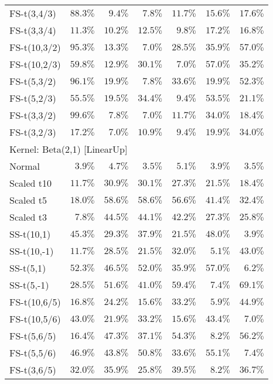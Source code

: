 \begin{longtable}{lrrrrrr}
FS-t(3,4/3) & $88.3\%$ & $9.4\%$ & $7.8\%$ & $11.7\%$ & $15.6\%$ & $17.6\%$ \\ 
FS-t(3,3/4) & $11.3\%$ & $10.2\%$ & $12.5\%$ & $9.8\%$ & $17.2\%$ & $16.8\%$ \\ 
FS-t(10,3/2) & $95.3\%$ & $13.3\%$ & $7.0\%$ & $28.5\%$ & $35.9\%$ & $57.0\%$ \\ 
FS-t(10,2/3) & $59.8\%$ & $12.9\%$ & $30.1\%$ & $7.0\%$ & $57.0\%$ & $35.2\%$ \\ 
FS-t(5,3/2) & $96.1\%$ & $19.9\%$ & $7.8\%$ & $33.6\%$ & $19.9\%$ & $52.3\%$ \\ 
FS-t(5,2/3) & $55.5\%$ & $19.5\%$ & $34.4\%$ & $9.4\%$ & $53.5\%$ & $21.1\%$ \\ 
FS-t(3,3/2) & $99.6\%$ & $7.8\%$ & $7.0\%$ & $11.7\%$ & $34.0\%$ & $18.4\%$ \\ 
FS-t(3,2/3) & $17.2\%$ & $7.0\%$ & $10.9\%$ & $9.4\%$ & $19.9\%$ & $34.0\%$ \\ 
\midrule
\multicolumn{7}{l}{Kernel: Beta(2,1) [LinearUp]} \\ 
\midrule
Normal & $3.9\%$ & $4.7\%$ & $3.5\%$ & $5.1\%$ & $3.9\%$ & $3.5\%$ \\ 
Scaled t10 & $11.7\%$ & $30.9\%$ & $30.1\%$ & $27.3\%$ & $21.5\%$ & $18.4\%$ \\ 
Scaled t5 & $18.0\%$ & $58.6\%$ & $58.6\%$ & $56.6\%$ & $41.4\%$ & $32.4\%$ \\ 
Scaled t3 & $7.8\%$ & $44.5\%$ & $44.1\%$ & $42.2\%$ & $27.3\%$ & $25.8\%$ \\ 
SS-t(10,1) & $45.3\%$ & $29.3\%$ & $37.9\%$ & $21.5\%$ & $48.0\%$ & $3.9\%$ \\ 
SS-t(10,-1) & $11.7\%$ & $28.5\%$ & $21.5\%$ & $32.0\%$ & $5.1\%$ & $43.0\%$ \\ 
SS-t(5,1) & $52.3\%$ & $46.5\%$ & $52.0\%$ & $35.9\%$ & $57.0\%$ & $6.2\%$ \\ 
SS-t(5,-1) & $28.5\%$ & $51.6\%$ & $41.0\%$ & $59.4\%$ & $7.4\%$ & $69.1\%$ \\ 
FS-t(10,6/5) & $16.8\%$ & $24.2\%$ & $15.6\%$ & $33.2\%$ & $5.9\%$ & $44.9\%$ \\ 
FS-t(10,5/6) & $43.0\%$ & $21.9\%$ & $33.2\%$ & $15.6\%$ & $43.4\%$ & $7.0\%$ \\ 
FS-t(5,6/5) & $16.4\%$ & $47.3\%$ & $37.1\%$ & $54.3\%$ & $8.2\%$ & $56.2\%$ \\ 
FS-t(5,5/6) & $46.9\%$ & $43.8\%$ & $50.8\%$ & $33.6\%$ & $55.1\%$ & $7.4\%$ \\ 
FS-t(3,6/5) & $32.0\%$ & $35.9\%$ & $25.8\%$ & $39.5\%$ & $8.2\%$ & $36.7\%$ \\ 

\end{longtable}
